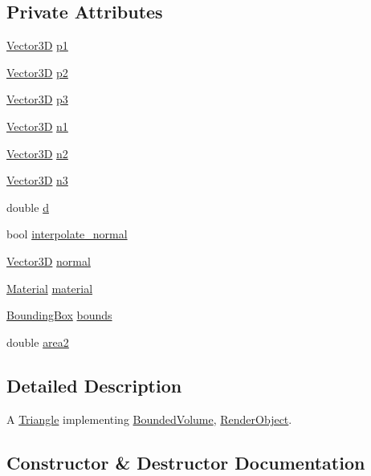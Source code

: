 \subsection*{Private Attributes}
\begin{DoxyCompactItemize}
\item 
\hyperlink{classVector3D}{Vector3D} \hyperlink{classTriangle_a0461ba6ca1a0e1aa84062f93eacbe8b8}{p1}
\item 
\hyperlink{classVector3D}{Vector3D} \hyperlink{classTriangle_aa15acbc4f123f3e9e75e574566c2679a}{p2}
\item 
\hyperlink{classVector3D}{Vector3D} \hyperlink{classTriangle_a600c7366c1dad8996026742eb12434c6}{p3}
\item 
\hyperlink{classVector3D}{Vector3D} \hyperlink{classTriangle_a51a16cfc88994c78e31340029bac777f}{n1}
\item 
\hyperlink{classVector3D}{Vector3D} \hyperlink{classTriangle_ab5786d87c9f548c1e8bb5937977dd0af}{n2}
\item 
\hyperlink{classVector3D}{Vector3D} \hyperlink{classTriangle_ae91046acca032af6fb931497127f8a7e}{n3}
\item 
double \hyperlink{classTriangle_a0cb5b18a8ce2cf896712cd3f9e6c80ea}{d}
\item 
bool \hyperlink{classTriangle_ac0fad333557f59ba9d9cafb8c16b203a}{interpolate\+\_\+normal}
\item 
\hyperlink{classVector3D}{Vector3D} \hyperlink{classTriangle_ac6e29ae9d1f7abc16cfb25357c74806f}{normal}
\item 
\hyperlink{classMaterial}{Material} \hyperlink{classTriangle_ae170999b9b35d778d9a0d084d256547b}{material}
\item 
\hyperlink{classBoundingBox}{Bounding\+Box} \hyperlink{classTriangle_ac5b18fe5f9ea12fb717e3306c300527d}{bounds}
\item 
double \hyperlink{classTriangle_a43322fb75910877dd63b17d391e3022b}{area2}
\end{DoxyCompactItemize}


\subsection{Detailed Description}
A \hyperlink{classTriangle}{Triangle} implementing \hyperlink{classBoundedVolume}{Bounded\+Volume}, \hyperlink{classRenderObject}{Render\+Object}. 

\subsection{Constructor \& Destructor Documentation}
